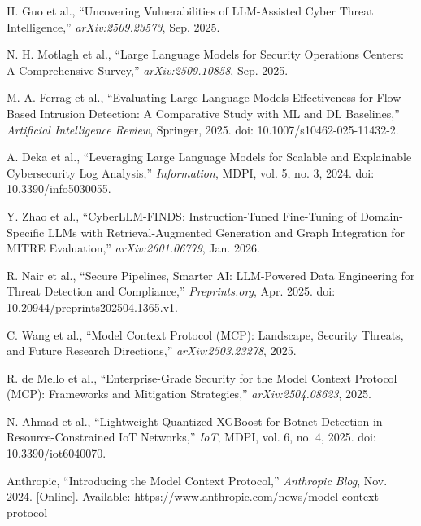 \documentclass[12pt]{article}
\begin{document}
\begin{enumerate}[leftmargin=*, label={[\arabic*]}]

\item H. Guo et al., ``Uncovering Vulnerabilities of LLM-Assisted Cyber Threat Intelligence,'' \textit{arXiv:2509.23573}, Sep. 2025.

\item N. H. Motlagh et al., ``Large Language Models for Security Operations Centers: A Comprehensive Survey,'' \textit{arXiv:2509.10858}, Sep. 2025.

\item M. A. Ferrag et al., ``Evaluating Large Language Models Effectiveness for Flow-Based Intrusion Detection: A Comparative Study with ML and DL Baselines,'' \textit{Artificial Intelligence Review}, Springer, 2025. doi: 10.1007/s10462-025-11432-2.

\item A. Deka et al., ``Leveraging Large Language Models for Scalable and Explainable Cybersecurity Log Analysis,'' \textit{Information}, MDPI, vol. 5, no. 3, 2024. doi: 10.3390/info5030055.

\item Y. Zhao et al., ``CyberLLM-FINDS: Instruction-Tuned Fine-Tuning of Domain-Specific LLMs with Retrieval-Augmented Generation and Graph Integration for MITRE Evaluation,'' \textit{arXiv:2601.06779}, Jan. 2026.

\item R. Nair et al., ``Secure Pipelines, Smarter AI: LLM-Powered Data Engineering for Threat Detection and Compliance,'' \textit{Preprints.org}, Apr. 2025. doi: 10.20944/preprints202504.1365.v1.

\item C. Wang et al., ``Model Context Protocol (MCP): Landscape, Security Threats, and Future Research Directions,'' \textit{arXiv:2503.23278}, 2025.

\item R. de Mello et al., ``Enterprise-Grade Security for the Model Context Protocol (MCP): Frameworks and Mitigation Strategies,'' \textit{arXiv:2504.08623}, 2025.

\item N. Ahmad et al., ``Lightweight Quantized XGBoost for Botnet Detection in Resource-Constrained IoT Networks,'' \textit{IoT}, MDPI, vol. 6, no. 4, 2025. doi: 10.3390/iot6040070.

\item Anthropic, ``Introducing the Model Context Protocol,'' \textit{Anthropic Blog}, Nov. 2024. [Online]. Available: https://www.anthropic.com/news/model-context-protocol


\end{enumerate}
\end{document}
